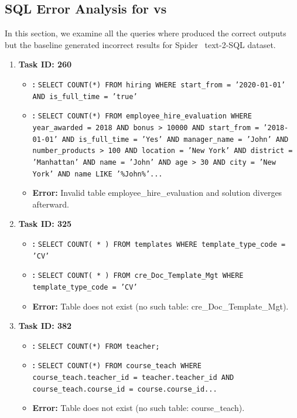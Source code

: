 \subsection{SQL Error Analysis for \syncode{} vs \Tool{}}
\label{sec:sql_error}

In this section, we examine all the queries where \Tool{} produced the correct outputs but the baseline \syncode{} generated incorrect results for Spider~\cite{yu-etal-2018-spider} text-2-SQL dataset.

\begin{enumerate}
    \item
    \textbf{Task ID: 260}
    \begin{itemize}
        \item \textbf{\Tool{}:} \texttt{SELECT COUNT(*) FROM hiring WHERE start\_from = '2020-01-01' AND is\_full\_time = 'true'}
        \item \textbf{\syncode{}:} \texttt{SELECT COUNT(*) FROM employee\_hire\_evaluation WHERE year\_awarded = 2018 AND bonus > 10000 AND start\_from = '2018-01-01' AND is\_full\_time = 'Yes' AND manager\_name = 'John' AND number\_products > 100 AND location = 'New York' AND district = 'Manhattan' AND name = 'John' AND age > 30 AND city = 'New York' AND name LIKE '\%John\%'...}
        \item \textbf{Error:} Invalid table employee\_hire\_evaluation and \syncode{} solution diverges afterward.    \end{itemize}

    \item
    \textbf{Task ID: 325}
    \begin{itemize}
        \item \textbf{\Tool{}:} \texttt{SELECT COUNT( * ) FROM templates WHERE template\_type\_code = 'CV'}
        \item \textbf{\syncode{}:} \texttt{SELECT COUNT( * ) FROM cre\_Doc\_Template\_Mgt WHERE template\_type\_code = 'CV'}
        \item \textbf{Error:} Table does not exist (no such table: cre\_Doc\_Template\_Mgt).
    \end{itemize}

    \item
    \textbf{Task ID: 382}
    \begin{itemize}
        \item \textbf{\Tool{}:} 
        \texttt{SELECT COUNT(*) FROM teacher;}
        \item \textbf{\syncode{}:} 
        \texttt{SELECT COUNT(*) FROM course\_teach WHERE course\_teach.teacher\_id = teacher.teacher\_id AND course\_teach.course\_id = course.course\_id...}
        \item \textbf{Error:} Table does not exist (no such table: course\_teach).
    \end{itemize}


\end{enumerate}
